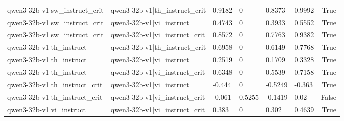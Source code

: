 \begin{table}
\begin{tabular}{llllllr}
qwen3-32b-v1|sw_instruct_crit & qwen3-32b-v1|th_instruct_crit & 0.9182 & 0 & 0.8373 & 0.9992 & True \\
qwen3-32b-v1|sw_instruct_crit & qwen3-32b-v1|vi_instruct & 0.4743 & 0 & 0.3933 & 0.5552 & True \\
qwen3-32b-v1|sw_instruct_crit & qwen3-32b-v1|vi_instruct_crit & 0.8572 & 0 & 0.7763 & 0.9382 & True \\
qwen3-32b-v1|th_instruct & qwen3-32b-v1|th_instruct_crit & 0.6958 & 0 & 0.6149 & 0.7768 & True \\
qwen3-32b-v1|th_instruct & qwen3-32b-v1|vi_instruct & 0.2519 & 0 & 0.1709 & 0.3328 & True \\
qwen3-32b-v1|th_instruct & qwen3-32b-v1|vi_instruct_crit & 0.6348 & 0 & 0.5539 & 0.7158 & True \\
qwen3-32b-v1|th_instruct_crit & qwen3-32b-v1|vi_instruct & -0.444 & 0 & -0.5249 & -0.363 & True \\
qwen3-32b-v1|th_instruct_crit & qwen3-32b-v1|vi_instruct_crit & -0.061 & 0.5255 & -0.1419 & 0.02 & False \\
qwen3-32b-v1|vi_instruct & qwen3-32b-v1|vi_instruct_crit & 0.383 & 0 & 0.302 & 0.4639 & True \\
\bottomrule
\end{tabular}
\end{table}
